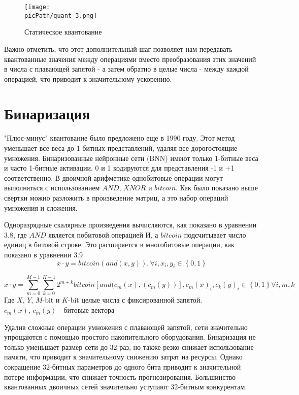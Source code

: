 \documentclass[oneside,final,12pt]{extreport}
\newcommand{\picPath}{images}
\begin{document}
\begin{figure}[H]
\begin{center}
  \texttt{[image: \\picPath/quant\_3.png]}
  \caption{Статическое квантование}
  \label{fig:quant_3}
  \end{center}
\end{figure}

Важно отметить, что этот дополнительный шаг позволяет нам передавать квантованные значения между операциями вместо преобразования этих значений в числа с плавающей запятой - а затем обратно в целые числа - между каждой операцией, что приводит к значительному ускорению. 

\section{Бинаризация}
"Плюс-минус" квантование было предложено еще в 1990 году. Этот метод уменьшает все веса до 1-битных представлений, удаляя все дорогостоящие умножения. Бинаризованные нейронные сети (BNN) имеют только 1-битные веса и часто 1-битные активации. 0 и 1 кодируются для представления -1 и +1 соответственно. В двоичной арифметике однобитовые операции могут выполняться с использованием $AND$, $XNOR$ и $bitcoin$. Как было показано выше свертки можно разложить в произведение матриц, а это набор операций умножения и сложения.

Одноразрядные скалярные произведения вычисляются, как показано в уравнении 3.8, где $AND$ является побитовой операцией И, а $bitcoin$ подсчитывает число единиц в битовой строке. Это расширяется в многобитовые операции, как показано в уравнении 3.9
\begin{equation}
    x \cdot y = bitcoin(and(x,y)), \forall i,x_i,y_i \in \left \{ 0,1 \right \}
\end{equation}

\begin{equation}
    x \cdot y = \sum_{m=0}^{M-1}\sum_{k=0}^{K-1}2^{m+k}bitcoin[and(c_m(x),(c_m(y))], c_m(x)_i, c_k(y)_i \in \left \{ 0,1 \right \}\forall i,m,k
\end{equation}
Где $X$, $Y$, $M$-bit и $K$-bit целые числа с фиксированной запятой.\\
$c_m(x)$, $c_m(y)$ - битовые вектора

Удалив сложные операции умножения с плавающей запятой, сети значительно упрощаются с помощью простого накопительного оборудования. Бинаризация не только уменьшает размер сети до 32 раз, но также резко снижает использование памяти, что приводит к значительному снижению затрат на ресурсы. Однако сокращение 32-битных параметров до одного бита приводит к значительной потере информации, что снижает точность прогнозирования. Большинство квантованных двоичных сетей значительно уступают 32-битным конкурентам.
\end{document}
